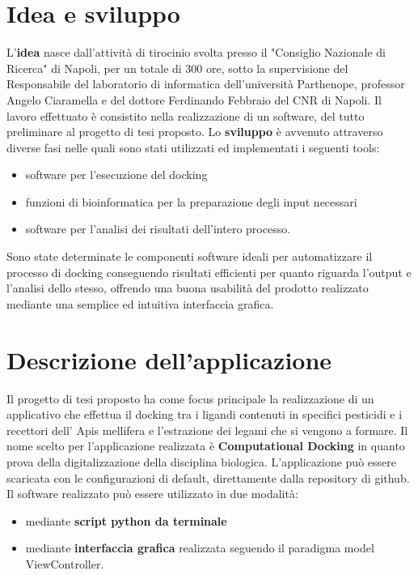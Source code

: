 \section{Idea e sviluppo}
L’\textbf{idea} nasce dall’attività di tirocinio svolta presso il "Consiglio Nazionale di Ricerca" di Napoli, per un totale di 300 ore, sotto la supervisione del Responsabile del laboratorio di informatica dell'università Parthenope, professor Angelo Ciaramella e del dottore Ferdinando Febbraio del CNR di Napoli. Il lavoro effettuato è consistito nella realizzazione di un software, del tutto preliminare al progetto di tesi proposto. Lo \textbf{sviluppo} è avvenuto attraverso diverse fasi nelle quali sono stati utilizzati ed implementati i seguenti tools: 

\begin{itemize}
    \item software per l'esecuzione del docking
    \item funzioni di bioinformatica per la preparazione degli input necessari
    \item software per l'analisi dei risultati dell'intero processo.
\end{itemize}

Sono state determinate le componenti software ideali per automatizzare il processo di docking conseguendo risultati efficienti per quanto riguarda l'output e l'analisi dello stesso, offrendo una buona usabilità del prodotto realizzato mediante una semplice ed intuitiva interfaccia grafica.

\section{Descrizione dell'applicazione}
Il progetto di tesi proposto ha come focus principale la realizzazione di un applicativo che effettua il docking tra i ligandi contenuti in specifici pesticidi e i recettori dell’ Apis mellifera e l’estrazione dei legami che si vengono a 
formare.\newline
Il nome scelto per l'applicazione realizzata è \textbf{Computational Docking} in quanto prova della digitalizzazione della disciplina biologica.\newline
L’applicazione può essere scaricata con le configurazioni di default, direttamente dalla repository di github. Il software realizzato può essere utilizzato in due modalità: 

\begin{itemize}
    \item mediante \textbf{script python da terminale}
    \item mediante \textbf{interfaccia grafica} realizzata seguendo il paradigma model ViewController.
\end{itemize} 

